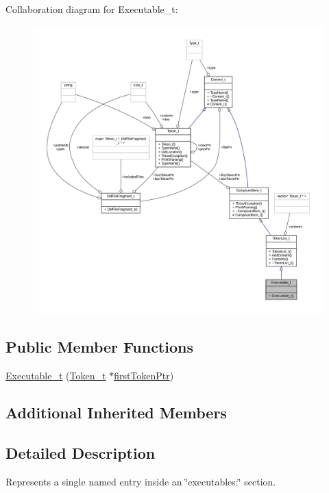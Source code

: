 Collaboration diagram for Executable\+\_\+t\+:
\nopagebreak
\begin{figure}[H]
\begin{center}
\leavevmode
\includegraphics[width=350pt]{struct_executable__t__coll__graph}
\end{center}
\end{figure}
\subsection*{Public Member Functions}
\begin{DoxyCompactItemize}
\item 
\hyperlink{struct_executable__t_a5555b8c2790254b34a0ed3b370a01947}{Executable\+\_\+t} (\hyperlink{struct_token__t}{Token\+\_\+t} $\ast$\hyperlink{struct_compound_item__t_a4d95dc788120f627e332491589d20c5c}{first\+Token\+Ptr})
\end{DoxyCompactItemize}
\subsection*{Additional Inherited Members}


\subsection{Detailed Description}
Represents a single named entry inside an \char`\"{}executables\+:\char`\"{} section. 

